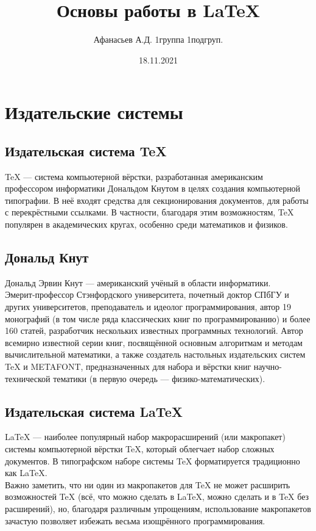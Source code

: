 \documentclass[a4paper,12pt]{article} %
\author{Афанасьев А.Д. 1группа 1подгруп.}
\title{Основы работы в \LaTeX{}}
\date{18.11.2021}
\begin{document}
\maketitle
\newpage
\section{Издательские системы}
\subsection{Издательская система TeX}
TeX --- система компьютерной вёрстки, разработанная американским профессором информатики Дональдом Кнутом в целях создания компьютерной типографии. В неё входят средства для секционирования документов, для работы с перекрёстными ссылками. В частности, благодаря этим возможностям, TeX популярен в академических кругах, особенно среди математиков и физиков.

\subsection{Дональд Кнут}
Дональд Эрвин Кнут --- американский учёный в области информатики.\\
Эмерит-профессор Стэнфордского университета, почетный доктор СПбГУ и других университетов, преподаватель и идеолог программирования, автор 19 монографий (в том числе ряда классических книг по программированию) и более 160 статей, разработчик нескольких известных программных технологий. Автор всемирно известной серии книг, посвящённой основным алгоритмам и методам вычислительной математики, а также создатель настольных издательских систем TeX и METAFONT, предназначенных для набора и вёрстки книг научно-технической тематики (в первую очередь --- физико-математических).

\subsection{Издательская система LaTeX}
LaTeX --- наиболее популярный набор макрорасширений (или макропакет) системы компьютерной вёрстки TeX, который облегчает набор сложных документов. В типографском наборе системы TeX форматируется традиционно как LaTeX.\\
Важно заметить, что ни один из макропакетов для TeX не может расширить возможностей TeX (всё, что можно сделать в LaTeX, можно сделать и в TeX без расширений), но, благодаря различным упрощениям, использование макропакетов зачастую позволяет избежать весьма изощрённого программирования.
\end{document}
